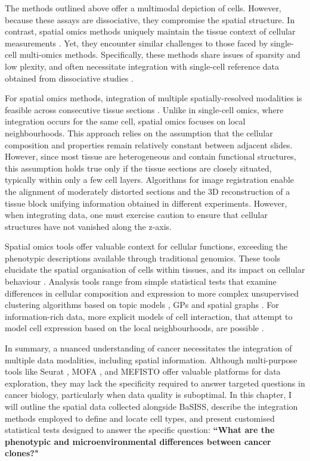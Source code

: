 The methods outlined above offer a multimodal depiction of cells. However, because these assays are dissociative, they compromise the spatial structure. In contrast, spatial omics methods uniquely maintain the tissue context of cellular measurements . Yet, they encounter similar challenges to those faced by single-cell multi-omics methods. Specifically, these methods share issues of sparsity and low plexity, and often necessitate integration with single-cell reference data obtained from dissociative studies . 

For spatial omics methods, integration of multiple spatially-resolved modalities is feasible across consecutive tissue sections . Unlike in single-cell omics, where integration occurs for the same cell, spatial omics focuses on local neighbourhoods. This approach relies on the assumption that the cellular composition and properties remain relatively constant between adjacent slides. However, since most tissue are heterogeneous and contain functional structures, this assumption holds true only if the tissue sections are closely situated, typically within only a few cell layers. Algorithms for image registration enable the alignment of moderately distorted sections and the 3D reconstruction of a tissue block \parencite{Kiemen2020-dc} unifying information obtained in different experiments. However, when integrating data, one must exercise caution to ensure that cellular structures have not vanished along the z-axis.

Spatial omics tools offer valuable context for cellular functions, exceeding the phenotypic descriptions available through traditional genomics. These tools elucidate the spatial organisation of cells within tissues, and its impact on cellular behaviour . Analysis tools range from simple statistical tests that examine differences in cellular composition and expression to more complex unsupervised clustering algorithms based on topic models \parencite{Nirmal2022-sq}, \aclp{GP} \parencite{Svensson2018-eu} and spatial graphs \parencite{Danenberg2022-zb}. For information-rich data, more explicit models of cell interaction, that attempt to model cell expression based on the local neighbourhoods, are possible \parencite{Fischer2023-go}.

In summary, a nuanced understanding of cancer necessitates the integration of multiple data modalities, including spatial information. Although multi-purpose tools like Seurat \parencite{Hao2021-qn}, MOFA \parencite{Argelaguet2018-oz}, and MEFISTO \parencite{Velten2022-gc} offer valuable platforms for data exploration, they may lack the specificity required to answer targeted questions in cancer biology, particularly when data quality is suboptimal. In this chapter, I will outline the spatial data collected alongside \ac{BaSISS}, describe the integration methods employed to define and locate cell types, and present customised statistical tests designed to answer the specific question: \textbf{``What are the phenotypic and microenvironmental differences between cancer clones?"}

